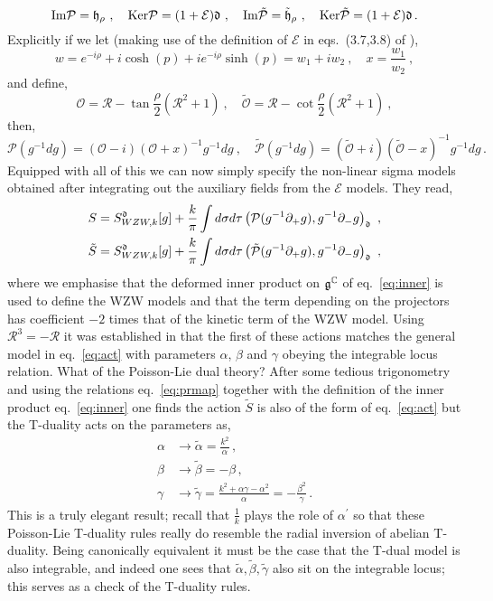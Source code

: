\documentclass[12pt]{article}
\def\ee{\boldsymbol{e}}
\def\R{{\mathbb R}}
\def\be{\begin{equation}}
\def\ee{\end{equation}}
\renewcommand{\R}{\mathcal{R}}
\begin{document}
  \be 
  \textrm{Im} {\mathcal P} = \frak{h}_\rho  \ , \quad   \textrm{Ker} {\mathcal P} = (1 + {\mathcal E})\frak{d} \ , \quad     \textrm{Im} \tilde{{\mathcal P}} =\tilde{\frak{h}}_\rho  \ , \quad    \textrm{Ker} \tilde{{\mathcal P}} = (1 +  {\mathcal E})\frak{d}\, .
  \ee
 Explicitly if we let (making use of the definition of $  {\mathcal E}$ in eqs.~(3.7,3.8) of  \cite{Klimcik:2017ken}), 
 \be
 w= e^{- i \rho} + i \cosh(p)+ i e^{- i \rho }\sinh(p) = w_1 + i w_2 \ , \quad x = \frac{w_1}{w_2}  \ , 
 \ee   
  and define,
  \be
  {\mathcal O} =\R- \tan\frac{\rho}{2}(\R^2 + 1) \ , \quad   \tilde{   {\mathcal O} } =\R- \cot\frac{\rho}{2}( \R^2 + 1)    \ , 
  \ee
  then, 
  \be
  {\mathcal P}(g^{-1} dg) = \left(  {\mathcal O} - i \right) \left(   {\mathcal O} + x \right)^{-1} g^{-1} dg  \ ,  \quad  \tilde{\mathcal{P} }(g^{-1} dg) = \left(  \tilde{{\mathcal O}} + i \right) \left(  \tilde {\mathcal O} - x \right)^{-1} g^{-1} dg \,.
  \ee  
 Equipped with all of this we can now simply specify the non-linear sigma models obtained after integrating out the auxiliary fields from the ${\mathcal E}$ models.  They read, 
 \be
 \begin{aligned}
 S = S_{WZW, k}^\frak{d}[g] + \frac{k}{\pi} \int    d  \sigma d\tau    \left(  {\mathcal P} (g^{-1} \partial_+ g ) , g^{-1} \partial_- g \right)_\frak{d} \ , \\ 
\tilde{S}=  S_{WZW, k}^\frak{d}[g] + \frac{k}{\pi} \int    d  \sigma d\tau    \left(  \tilde{{\mathcal P} }(g^{-1} \partial_+ g ) , g^{-1} \partial_- g \right)_\frak{d} \ , 
\end{aligned} 
\ee   
 where we emphasise that the deformed inner product on $\frak{g}^\mathbb{C}$  of eq.~\eqref{eq:inner} is used to define the WZW models and that the term depending on the projectors has coefficient $-2$ times that of the kinetic term of the WZW model.   Using $\R^3 =- \R$ it was established in \cite{Klimcik:2017ken}  that the first of these actions matches the general model  in eq.~\eqref{eq:act} with parameters $\alpha$, $\beta$ and $\gamma$ obeying the integrable locus relation.  What of the Poisson-Lie dual theory?  After some tedious trigonometry and using the relations eq.~\eqref{eq:prmap} together with the definition of the inner product eq.~\eqref{eq:inner} one finds the action $\tilde{S}$  is also of the form of eq.~\eqref{eq:act} but the T-duality acts on the parameters as, 
 \be
 \begin{aligned}\label{eq:plduality}
 \alpha &\to  \tilde{\alpha} = \frac{k^2}{\alpha}\, ,  \\
 \beta &\to  \tilde{\beta} = - \beta\, , \\
 \gamma &\to   \tilde{\gamma} = \frac{k^2 + \alpha \gamma - \alpha^2}{\alpha} = -\frac{\beta^2}{\gamma} \, . 
  \end{aligned}
 \ee
 This is a truly elegant result; recall that $\frac{1}{k}$ plays the role of $\alpha^\prime$ so that these Poisson-Lie T-duality rules really do resemble the radial inversion of abelian T-duality.   Being canonically equivalent it must be the case that the T-dual model is also integrable, and indeed one sees that $\tilde{\alpha}, \tilde{\beta} , \tilde{\gamma}$ also sit on the integrable locus; this serves as a check of the T-duality rules.  
 
\end{document}
